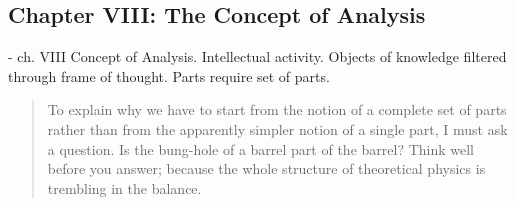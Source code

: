 \subsection{Chapter VIII: The Concept of Analysis}


- ch. VIII Concept of Analysis.  Intellectual activity.  Objects of knowledge filtered through frame of thought.  Parts require set of parts.

\begin{quote}
    To explain why we have to start from the notion of a complete set of parts rather than from the apparently simpler notion of a single part, I must ask a question.  Is the bung-hole of a barrel part of the barrel?  Think well before you answer; because the whole structure of theoretical physics is trembling in the balance.  \citep[p. 119]{Eddington1939}
\end{quote}


